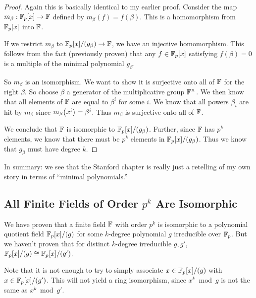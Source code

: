 \begin{proof}
  Again this is basically identical to my earlier proof. Consider the
  map $m_\beta: \mathbb{F}_p[x] \to \mathbb{F}$ defined by $m_\beta(f) = f(\beta)$. This
  is a homomorphism from $\mathbb{F}_p[x]$ into $\mathbb{F}$.

  If we restrict $m_\beta$ to $\mathbb{F}_p[x]/(g_\beta) \to \mathbb{F}$, we have an
  injective homomorphism. This follows from the fact (previously proven)
  that any $f \in \mathbb{F}_p[x]$ satisfying $f(\beta) = 0$ is a multiple of the
  minimal polynomial $g_\beta$.

  So $m_\beta$ is an isomorphism. We want to show it is surjective onto
  all of $\mathbb{F}$ for the right $\beta$. So choose $\beta$ a generator of
  the multiplicative group $\mathbb{F}^\times$. We then know that all elements
  of $\mathbb{F}$ are equal to $\beta^i$ for some $i$. We know that all powers
  $\beta_i$ are hit by $m_\beta$ since $m_\beta\mathopen{}\left( {x^i} \right)\mathclose{} = \beta^i$.
  Thus $m_\beta$ is surjective onto all of $\mathbb{F}$.

  We conclude that $\mathbb{F}$ is isomorphic to $\mathbb{F}_p[x]/(g_\beta)$. Further,
  since $\mathbb{F}$ has $p^k$ elements, we know that there must be $p^k$
  elements in $\mathbb{F}_p[x]/(g_\beta)$. Thus we know that $g_\beta$ must have
  degree $k$.
\end{proof}

\begin{remark}
  In summary: we see that the Stanford chapter is really just a
  retelling of my own story in terms of ``minimal polynomials.''
\end{remark}

\subsection{All Finite Fields of Order $p^k$ Are Isomorphic}

\begin{remark}
  We have proven that a finite field $\mathbb{F}$ with order $p^k$ is isomorphic
  to a polynomial quotient field $\mathbb{F}_p[x]/(g)$ for some $k$-degree
  polynomial $g$ irreducible over $\mathbb{F}_p$. But we haven't proven that for
  distinct $k$-degree irreducible $g, g'$, $\mathbb{F}_p[x]/(g) \cong \mathbb{F}_p[x]/(g')$.

  Note that it is not enough to try to simply associate $x \in \mathbb{F}_p[x]/(g)$
  with $x \in \mathbb{F}_p[x]/(g')$. This will not yield a ring isomorphism, since
  $x^k \bmod g$ is not the same as $x^k \bmod g'$.
\end{remark}

